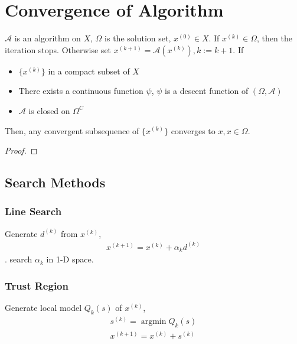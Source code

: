 \section{Convergence of Algorithm}
\par
\begin{theorem}
    $\mathcal{A}$ is an algorithm on $X$,
    $\Omega$ is the solution set, $x^{(0)} \in X$.
    If $x^{(k)} \in \Omega$, then the iteration stops.
    Otherwise set $x^{(k+1)} = \mathcal{A}(x^{(k)}), k:=k+1$.
    If
    \begin{itemize}
        \item $\{x^{(k)}\}$ in a compact subset of $X$
        \item There exists a continuous function $\psi$,
         $\psi$ is a descent function of $(\Omega, \mathcal{A})$
        \item $\mathcal{A}$ is closed on $\Omega^C$
    \end{itemize}
    Then, any convergent subsequence of $\{x^{(k)}\}$ converges to 
    $x, x \in \Omega$.
\end{theorem}
\begin{proof}
    
\end{proof}

\subsection{Search Methods}
\subsubsection{Line Search}
\par
Generate $d^{(k)}$ from 
$x^{(k)}$, 
\begin{align}
    x^{(k+1)} = x^{(k)} + \alpha_kd^{(k)}
\end{align}.
search $\alpha_k$ in 1-D space.
\par
\subsubsection{Trust Region}
\par
Generate local model $Q_{k}(s)$ of $x^{(k)}$,
\begin{align}
    s^{(k)} = \mathop{\arg\min} Q_k(s) \\
    x^{(k+1)} = x^{(k)} + s^{(k)}
\end{align}
